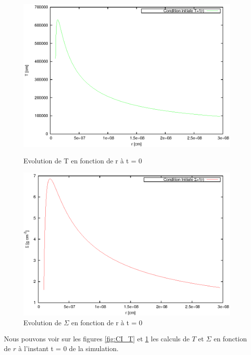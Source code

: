  \begin{figure}
   \begin{minipage}[c]{.46\linewidth}
      \includegraphics[scale=0.6]{ic_T.eps}
      \caption{Evolution de T en fonction de r à t = 0}\label{fig:CI_T}
   \end{minipage} \hfill
   \begin{minipage}[c]{.46\linewidth}
      \includegraphics[scale=0.6]{ic_Sig.eps}
      \caption{Evolution de $\Sigma$ en fonction de r à t = 0}\label{fig:CI_Sig}
   \end{minipage}
\end{figure} 


Nous pouvons voir sur les figures \ref{fig:CI_T} et \ref{fig:CI_Sig} les calculs de $T$ et $\Sigma$ en fonction de $r$ à l'instant t = 0 de la simulation. \\


